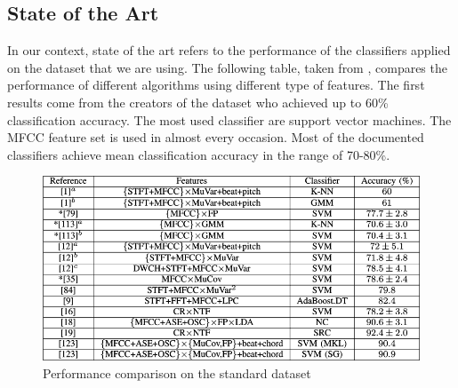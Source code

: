 \documentclass[a4paper,11pt,oneside]{article}
\begin{document}
\subsection{State of the Art}
In our context, state of the art refers to the performance of the classifiers applied
on the dataset that we are using. The following table, taken from \cite{survey2}, compares the performance
of different algorithms using different type of features. The first results come from the creators
of the dataset who achieved up to 60\% classification accuracy. The most used classifier are
support vector machines. The MFCC feature set is used in almost every occasion. Most of the documented 
classifiers achieve mean classification accuracy in the range of 70-80\%.
\begin{figure}[h]
  \includegraphics[scale=0.5]{art}
  \centering
  \caption{Performance comparison on the standard dataset}
\end{figure}
\end{document}
